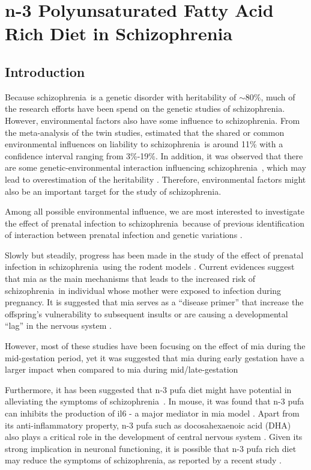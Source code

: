 \documentclass[12pt]{scrbook}
\newcommand*{\scz}{schizophrenia}
\begin{document}
\chapter{n-3 Polyunsaturated Fatty Acid Rich Diet in Schizophrenia}
\label{omegaProject}
\section{Introduction}
Because \scz\ is a genetic disorder with heritability of $\sim80\%$, much of the research efforts have been spend on the genetic studies of \scz.
However, environmental factors also have some influence to \scz.
From the meta-analysis of the twin studies, \citet{sullivan2003schizophrenia} estimated that the shared or common environmental influences on liability to \scz\ is around 11\% with a confidence interval ranging from 3\%-19\%.
In addition, it was observed that there are some genetic-environmental interaction influencing \scz\ \citep{Tienari2004,Clarke2009},  which may lead to overestimation of the heritability \citet{zuk2012mystery}. 
Therefore, environmental factors might also be an important target for the study of \scz.

Among all possible environmental influence, we are most interested to investigate the effect of prenatal infection to \scz\ because of previous identification of interaction between prenatal infection and genetic variations \citep{Clarke2009}.

Slowly but steadily, progress has been made in the study of the effect of prenatal infection in \scz\ using the rodent models \citep{Oskvig2012,Smith2007,Garbett2012a}.
Current evidences suggest that \gls{mia} as the main mechanisms that leads to the increased risk of \scz\ in individual whose mother were exposed to infection during pregnancy.
It is suggested that \gls{mia} serves as a ``disease primer'' that increase the offspring's vulnerability to subsequent insults \citep{Giovanoli2013} or are causing a developmental ``lag'' in the nervous system \citep{Meyer2007a,Garbett2012a}.

However, most of these studies have been focusing on the effect of \gls{mia} during the mid-gestation period, yet it was suggested that \gls{mia} during early gestation have a larger impact when compared to \gls{mia} during mid/late-gestation \citep{Meyer2007a,Li2010a}

Furthermore, it has been suggested that n-3 \gls{pufa} diet might have potential in alleviating the symptoms of \scz\ \citep{Li2015,Trebble2003}. 
In mouse, it was found that n-3 \gls{pufa} can inhibits the production of \gls{il6} \citep{Trebble2003} - a major mediator in \gls{mia} model \citep{Smith2007}.
Apart from its anti-inflammatory property, n-3 \gls{pufa} such as docosahexaenoic acid (DHA) also plays a critical role in the development of central nervous system \citep{Clandinin1999,Kitajka2002}.
Given its strong implication in neuronal functioning, it is possible that n-3 \gls{pufa} rich diet may reduce the symptoms of \scz, as reported by a recent study \citep{Li2015}.
\end{document}
